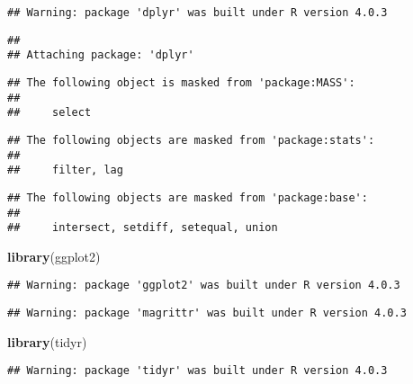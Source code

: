 \documentclass[
]{article}
\newenvironment{Shaded}{\begin{snugshade}}{\end{snugshade}}
\newcommand{\CommentTok}[1]{\textcolor[rgb]{0.56,0.35,0.01}{\textit{#1}}}
\newcommand{\KeywordTok}[1]{\textcolor[rgb]{0.13,0.29,0.53}{\textbf{#1}}}
\newcommand{\NormalTok}[1]{#1}
\begin{document}
\begin{verbatim}
## Warning: package 'dplyr' was built under R version 4.0.3
\end{verbatim}

\begin{verbatim}
## 
## Attaching package: 'dplyr'
\end{verbatim}

\begin{verbatim}
## The following object is masked from 'package:MASS':
## 
##     select
\end{verbatim}

\begin{verbatim}
## The following objects are masked from 'package:stats':
## 
##     filter, lag
\end{verbatim}

\begin{verbatim}
## The following objects are masked from 'package:base':
## 
##     intersect, setdiff, setequal, union
\end{verbatim}

\begin{Shaded}
\begin{Highlighting}[]
\KeywordTok{library}\NormalTok{(ggplot2)}
\end{Highlighting}
\end{Shaded}

\begin{verbatim}
## Warning: package 'ggplot2' was built under R version 4.0.3
\end{verbatim}

\begin{Shaded}
\end{Shaded}

\begin{verbatim}
## Warning: package 'magrittr' was built under R version 4.0.3
\end{verbatim}

\begin{Shaded}
\begin{Highlighting}[]
\KeywordTok{library}\NormalTok{(tidyr)}
\end{Highlighting}
\end{Shaded}

\begin{verbatim}
## Warning: package 'tidyr' was built under R version 4.0.3
\end{verbatim}
\end{document}
